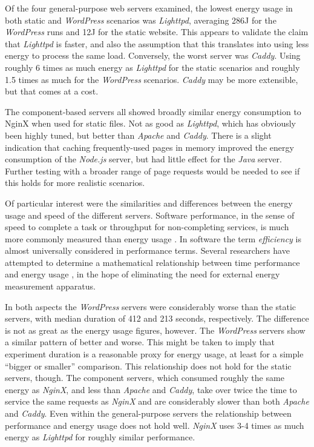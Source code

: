 Of the four general-purpose web servers examined, the lowest energy usage in both static and \emph{WordPress} scenarios was \emph{Lighttpd}, averaging 286J for the \emph{WordPress} runs and 12J for the static website. This appears to validate the claim that \emph{Lighttpd} is faster, and also the assumption that this translates into using less energy to process the same load. Conversely, the worst server was \emph{Caddy}. Using roughly 6 times as much energy as \emph{Lighttpd} for the static scenarios and roughly 1.5 times as much for the \emph{WordPress} scenarios. \emph{Caddy} may be more extensible, but that comes at a cost.

The component-based servers all showed broadly similar energy consumption to NginX when used for static files. Not as good as \emph{Lighttpd}, which has obviously been highly tuned, but better than \emph{Apache} and \emph{Caddy}. There is a slight indication that caching frequently-used pages in memory improved the energy consumption of the \emph{Node.js} server, but had little effect for the \emph{Java} server. Further testing with a broader range of page requests would be needed to see if this holds for more realistic scenarios.

Of particular interest were the similarities and differences between the energy usage and speed of the different servers. Software performance, in the sense of speed to complete a task or throughput for non-completing services, is much more commonly measured than energy usage \citep{Freitas2014} \citep{Kuber2023}. In software the term \emph{efficiency} is almost universally considered in performance terms. Several researchers have attempted to determine a mathematical relationship between time performance and energy usage \citep{Kalaitzoglou2014} \citep{Stoico2023}, in the hope of eliminating the need for external energy measurement apparatus.

In both aspects the \emph{WordPress} servers were considerably worse than the static servers, with median duration of 412 and 213 seconds, respectively. The difference is not as great as the energy usage figures, however. The \emph{WordPress} servers show a similar pattern of better and worse. This might be taken to imply that experiment duration is a reasonable proxy for energy usage, at least for a simple \enquote{bigger or smaller} comparison. This relationship does not hold for the static servers, though. The component servers, which consumed roughly the same energy as \emph{NginX}, and less than \emph{Apache} and \emph{Caddy}, take over twice the time to service the same requests as \emph{NginX} and are considerably slower than both \emph{Apache} and \emph{Caddy}. Even within the general-purpose servers the relationship between performance and energy usage does not hold well. \emph{NginX} uses 3-4 times as much energy as \emph{Lighttpd} for roughly similar performance.

